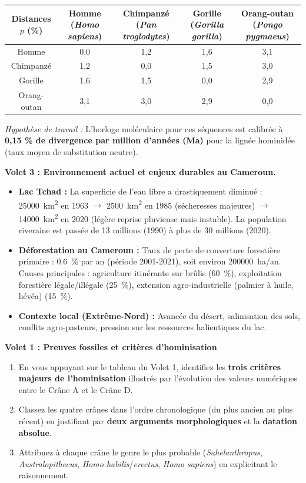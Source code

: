 \documentclass[11pt]{article}
\newcounter{popsec}
\newcounter{popsub}
\newcommand{\courssub}[1]{%
  \stepcounter{popsub}%
  \par\vspace{9pt}\noindent{\popxbold\fontsize{11.5}{13}\selectfont\color{popink}{\color{poporange}\thepopsec.\thepopsub}\hspace{6pt}#1}\par\nopagebreak\vspace{4pt}
}
\begin{document}
\begin{center}
\begin{tabular}{|c|cccc|}\hline
\rowcolor{popgreenL}
\textbf{Distances $p$ (\%)} & \textbf{Homme (\emph{Homo sapiens})} & \textbf{Chimpanzé (\emph{Pan troglodytes})} & \textbf{Gorille (\emph{Gorilla gorilla})} & \textbf{Orang-outan (\emph{Pongo pygmaeus})} \\ \hline
Homme & 0,0 & 1,2 & 1,6 & 3,1 \\ \hline
Chimpanzé & 1,2 & 0,0 & 1,5 & 3,0 \\ \hline
Gorille & 1,6 & 1,5 & 0,0 & 2,9 \\ \hline
Orang-outan & 3,1 & 3,0 & 2,9 & 0,0 \\ \hline
\end{tabular}
\end{center}
\emph{Hypothèse de travail :} L'horloge moléculaire pour ces séquences est calibrée à \textbf{0,15 \% de divergence par million d'années (Ma)} pour la lignée hominidée (taux moyen de substitution neutre).

\textbf{Volet 3 : Environnement actuel et enjeux durables au Cameroun.}
\begin{itemize}
    \item \textbf{Lac Tchad :} La superficie de l'eau libre a drastiquement diminué : \SI{25000}{km^2} en 1963 $\rightarrow$ \SI{2500}{km^2} en 1985 (sécheresses majeures) $\rightarrow$ \SI{14000}{km^2} en 2020 (légère reprise pluvieuse mais instable). La population riveraine est passée de 13 millions (1990) à plus de 30 millions (2020).
    \item \textbf{Déforestation au Cameroun :} Taux de perte de couverture forestière primaire : \SI{0,6}{\%} par an (période 2001-2021), soit environ \SI{200000}{ha/an}. Causes principales : agriculture itinérante sur brûlis (\SI{60}{\%}), exploitation forestière légale/illégale (\SI{25}{\%}), extension agro-industrielle (palmier à huile, hévéa) (\SI{15}{\%}).
    \item \textbf{Contexte local (Extrême-Nord) :} Avancée du désert, salinisation des sols, conflits agro-pasteurs, pression sur les ressources halieutiques du lac.
\end{itemize}

\courssub{Consignes}
\textbf{Volet 1 : Preuves fossiles et critères d'hominisation}
\begin{enumerate}
    \item En vous appuyant sur le tableau du Volet 1, identifiez les \textbf{trois critères majeurs de l'hominisation} illustrés par l'évolution des valeurs numériques entre le Crâne A et le Crâne D.
    \item Classez les quatre crânes dans l'ordre chronologique (du plus ancien au plus récent) en justifiant par \textbf{deux arguments morphologiques} et la \textbf{datation absolue}.
    \item Attribuez à chaque crâne le genre le plus probable (\emph{Sahelanthropus}, \emph{Australopithecus}, \emph{Homo habilis}/\emph{erectus}, \emph{Homo sapiens}) en explicitant le raisonnement.
\end{enumerate}
\end{document}
